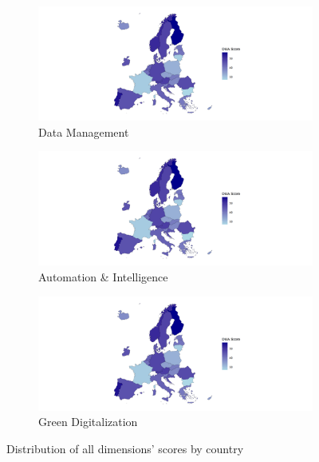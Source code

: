 \documentclass[12pt]{report}
\begin{document}
\begin{figure}[h!]
\begin{subfigure}[b]{0.49\textwidth}
        \label{fig:map14}
    \end{subfigure}
    \hfill
    \begin{subfigure}[b]{0.49\textwidth}
        \centering
        \includegraphics[width=0.3\textheight,trim=225 0 225 0,clip]{../Output/map5.png}        
        \caption{Data Management}
        \label{fig:map15}
    \end{subfigure}
    \vfill
    \begin{subfigure}[b]{0.49\textwidth}
        \centering
        \includegraphics[width=0.3\textheight,trim=225 0 225 0,clip]{../Output/map5.png}        
        \caption{Automation \& Intelligence}
        \label{fig:map16}
    \end{subfigure}
    \hfill
    \begin{subfigure}[b]{0.49\textwidth}
        \centering
        \includegraphics[width=0.3\textheight,trim=225 0 225 0,clip]{../Output/map5.png}        
        \caption{Green Digitalization}
        \label{fig:map17}
    \end{subfigure}
    \caption{Distribution of all dimensions' scores by country}
    \label{fig:dma_maps}
\end{figure}
\end{document}
